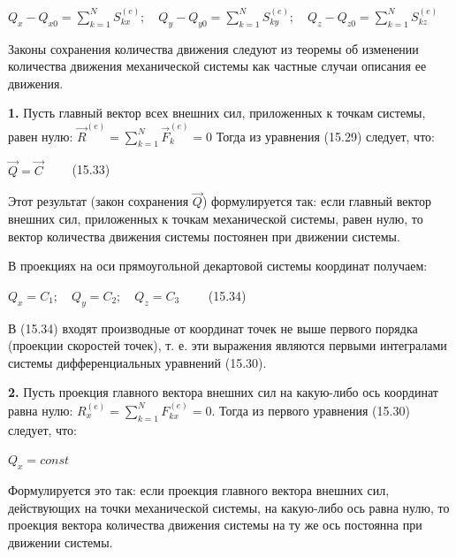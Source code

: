 {\begin{center}
    \par ${Q}_x - {Q}_{x0} = \sum_{k=1}^{N} {S}_{kx}^{(e)}; \quad
    {Q}_y - {Q}_{y0} = \sum_{k=1}^{N} {S}_{ky}^{(e)}; \quad
    {Q}_z - {Q}_{z0} = \sum_{k=1}^{N} {S}_{kz}^{(e)}$

    \par Законы сохранения количества движения следуют из теоремы об изменении количества движения механической системы как частные случаи описания ее движения.

    \par \textbf{1.} Пусть главный вектор всех внешних сил, приложенных к точкам системы, равен нулю: $\vec{R}^{(e)}=\sum_{k=1}^{N} \vec{F}_k^{(e)} = 0$ Тогда из уравнения (15.29) следует, что:

    \par $\vec{Q} = \vec{C} \qquad$ (15.33)

    \par Этот  результат  (закон  сохранения  $\vec{Q}$)   формулируется  так:  если  главный вектор внешних сил, приложенных к точкам механической системы, равен нулю, то вектор количества движения системы постоянен при движении системы.

    \par В  проекциях  на  оси  прямоугольной  декартовой  системы  координат получаем:

    \par $Q_x = C_1; \quad Q_y = C_2; \quad Q_z = C_3 \qquad$ (15.34)

    \par В (15.34) входят производные от координат точек не выше первого порядка (проекции скоростей точек), т. е. эти выражения являются первыми интегралами системы дифференциальных уравнений (15.30).

    \par \textbf{2.} Пусть проекция главного вектора внешних сил на какую-либо ось координат равна нулю: $R_x^{(e)}=\sum_{k=1}^{N} F_{kx}^{(e)}=0$. Тогда из первого уравнения (15.30) следует, что:

    \par $Q_x = const$

    \par Формулируется это  так:  если  проекция  главного  вектора внешних сил, действующих на точки механической системы, на какую-либо ось равна нулю, то проекция вектора количества движения системы на ту же ось постоянна при движении системы.
    
\end{center}

}
